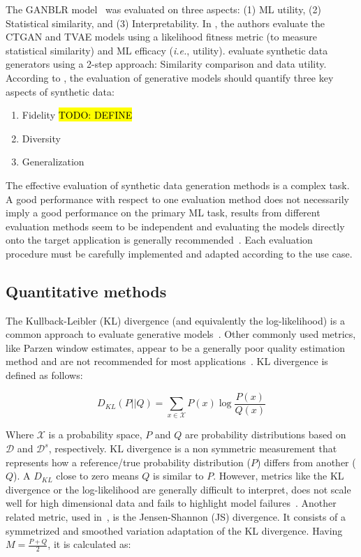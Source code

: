 \documentclass[parskip=full]{scrartcl}
\begin{document}
The GANBLR model~\cite{zhang2021ganblr} was evaluated on three aspects: (1) ML
utility, (2) Statistical similarity, and (3) Interpretability. In
\citet{xu2019modeling}, the authors evaluate the CTGAN and TVAE models using a
likelihood fitness metric (to measure statistical similarity) and ML efficacy
(\textit{i.e.}, utility). \citet{hittmeir2019utility} evaluate synthetic data
generators using a 2-step approach: Similarity comparison and data utility.
According to \citet{alaa2022faithful}, the evaluation of generative models
should quantify three key aspects of synthetic data:

\begin{enumerate}
    \item Fidelity \hl{TODO: DEFINE}
    \item Diversity 
    \item Generalization
\end{enumerate}

The effective evaluation of synthetic data generation methods is a complex
task. A good performance with respect to one evaluation method does not
necessarily imply a good performance on the primary ML task, results from
different evaluation methods seem to be independent and evaluating the models
directly onto the target application is generally
recommended~\cite{theis2016note}. Each evaluation procedure must be carefully
implemented and adapted according to the use case.

\subsection{Quantitative methods}

The Kullback-Leibler (KL) divergence (and equivalently the log-likelihood) is a
common approach to evaluate generative models~\cite{theis2016note}. Other
commonly used metrics, like Parzen window estimates, appear to be a generally
poor quality estimation method and are not recommended for most
applications~\citet{theis2016note}. KL divergence is defined as follows:

\begin{equation}
    D_{KL}(P||Q) = \sum_{x\in\mathcal{X}}P(x)\log{\frac{P(x)}{Q(x)}}
\end{equation}

Where $\mathcal{X}$ is a probability space, $P$ and $Q$ are probability
distributions based on $\mathcal{D}$ and $\mathcal{D}^s$, respectively. KL
divergence is a non symmetric measurement that represents how a reference/true
probability distribution ($P$) differs from another ($Q$). A $D_{KL}$ close to
zero means $Q$ is similar to $P$.  However, metrics like the KL divergence or
the log-likelihood are generally difficult to interpret, does not scale well
for high dimensional data and fails to highlight model
failures~\cite{alaa2022faithful}. Another related metric, used
in~\cite{zhao2021ctab}, is the Jensen-Shannon (JS) divergence. It consists of
a symmetrized and smoothed variation adaptation of the KL divergence. Having
$M=\frac{P+Q}{2}$, it is calculated as:
\end{document}
